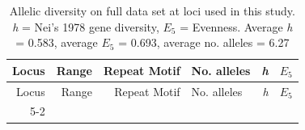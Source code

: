 \begin{longtable}[]{@{}rrrlrl@{}}
\caption{\label{tab:locus-stats} Allelic diversity on full data set at loci
used in this study. \emph{h} = Nei's 1978 gene diversity, \(E_5\) =
Evenness. Average \emph{h} = 0.583, average \(E_5\) = 0.693, average no.
alleles = 6.27}\tabularnewline
\toprule
\begin{minipage}[b]{0.08\columnwidth}\raggedleft\strut
Locus\strut
\end{minipage} & \begin{minipage}[b]{0.10\columnwidth}\raggedleft\strut
Range\strut
\end{minipage} & \begin{minipage}[b]{0.29\columnwidth}\raggedleft\strut
Repeat Motif\strut
\end{minipage} & \begin{minipage}[b]{0.14\columnwidth}\raggedright\strut
No. alleles\strut
\end{minipage} & \begin{minipage}[b]{0.06\columnwidth}\raggedleft\strut
\emph{h}\strut
\end{minipage} & \begin{minipage}[b]{0.07\columnwidth}\raggedright\strut
\(E_5\)\strut
\end{minipage}\tabularnewline
\midrule
\endfirsthead
\toprule
\begin{minipage}[b]{0.08\columnwidth}\raggedleft\strut
Locus\strut
\end{minipage} & \begin{minipage}[b]{0.10\columnwidth}\raggedleft\strut
Range\strut
\end{minipage} & \begin{minipage}[b]{0.29\columnwidth}\raggedleft\strut
Repeat Motif\strut
\end{minipage} & \begin{minipage}[b]{0.14\columnwidth}\raggedright\strut
No. alleles\strut
\end{minipage} & \begin{minipage}[b]{0.06\columnwidth}\raggedleft\strut
\emph{h}\strut
\end{minipage} & \begin{minipage}[b]{0.07\columnwidth}\raggedright\strut
\(E_5\)\strut
\end{minipage}\tabularnewline
\midrule
\endhead
\begin{minipage}[t]{0.08\columnwidth}\raggedleft\strut
5-2\strut
\end{minipage} & \begin{minipage}[t]{0.10\columnwidth}\raggedleft\strut

\end{minipage}
\end{longtable}
